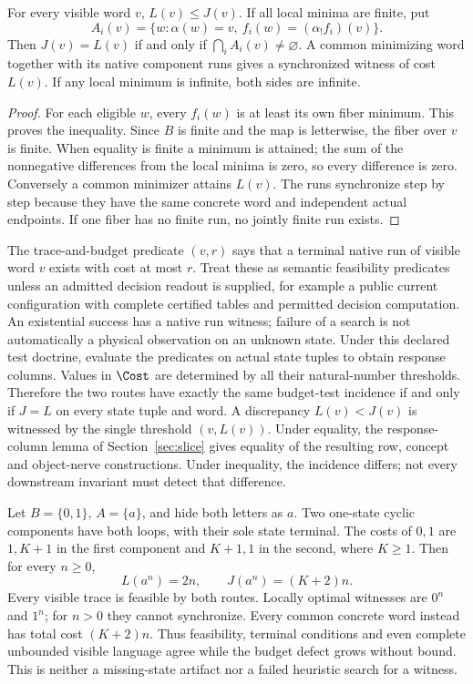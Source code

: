 \begin{theorem}\label{thm:native-gap}
For every visible word $v$, $L(v)\leq J(v)$. If all local minima are
finite, put
\[
 A_i(v)=\{w:\alpha(w)=v,\ f_i(w)=(\alpha_!f_i)(v)\}.
\]
Then $J(v)=L(v)$ if and only if $\bigcap_iA_i(v)\ne\varnothing$.
A common minimizing word together with its native component runs gives
a synchronized witness of cost $L(v)$. If any local minimum is infinite,
both sides are infinite.
\end{theorem}
\begin{proof}
For each eligible $w$, every $f_i(w)$ is at least its own fiber minimum.
This proves the inequality. Since $B$ is finite and the map is letterwise,
the fiber over $v$ is finite. When equality is finite a minimum is attained;
the sum of the nonnegative differences from the local minima is zero,
so every difference is zero. Conversely a common minimizer attains $L(v)$.
The runs synchronize step by step because they have the same concrete
word and independent actual endpoints. If one fiber has no finite run,
no jointly finite run exists.
\end{proof}

The trace-and-budget predicate $(v,r)$ says that a terminal native run
of visible word $v$ exists with cost at most $r$. Treat these as semantic
feasibility predicates unless an admitted decision readout is supplied,
for example a public current configuration with complete certified tables
and permitted decision computation. An existential success has a native
run witness; failure of a search is not automatically a physical observation
on an unknown state. Under this declared test doctrine, evaluate the
predicates on actual state tuples to obtain response columns. Values in $\Cost$ are determined
by all their natural-number thresholds. Therefore the two routes have
exactly the same budget-test incidence if and only if $J=L$ on every
state tuple and word. A discrepancy $L(v)<J(v)$ is witnessed by the
single threshold $(v,L(v))$. Under equality, the response-column lemma
of Section~\ref{sec:slice} gives equality of the resulting row, concept
and object-nerve constructions. Under inequality, the incidence differs;
not every downstream invariant must detect that difference.

\begin{example}
Let $B=\{0,1\}$, $A=\{a\}$, and hide both letters as $a$.
Two one-state cyclic components have both loops, with their sole state
terminal. The costs of $0,1$ are $1,K+1$ in the first component and
$K+1,1$ in the second, where $K\geq1$. Then for every $n\geq0$,
\[
 L(a^n)=2n,\qquad J(a^n)=(K+2)n.
\]
Every visible trace is feasible by both routes. Locally optimal witnesses
are $0^n$ and $1^n$; for $n>0$ they cannot synchronize. Every common
concrete word instead has total cost $(K+2)n$. Thus feasibility, terminal
conditions and even complete unbounded visible language agree while the
budget defect grows without bound. This is neither a missing-state
artifact nor a failed heuristic search for a witness.
\end{example}

